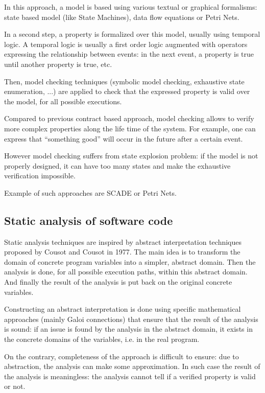 In this approach, a model is based using various textual or graphical
formalisms: state based model (like State Machines), data flow
equations or Petri Nets.

In a second step, a property is formalized over this model, usually
using temporal logic. A temporal logic is usually a first order logic
augmented with operators expressing the relationship between events:
in the next event, a property is true until another property is true,
etc.

Then, model checking techniques (symbolic model checking, exhaustive
state enumeration, ...) are applied to check that the expressed
property is valid over the model, for all possible executions.

Compared to previous contract based approach, model checking allows to
verify more complex properties along the life time of the system. For
example, one can express that ``something good'' will occur in the
future after a certain event.

However model checking suffers from state explosion problem: if the
model is not properly designed, it can have too many states and make
the exhaustive verification impossible.

Example of such approaches are SCADE or Petri Nets.

\subsection{Static analysis of software code}

Static analysis techniques are inspired by abstract interpretation
techniques proposed by Cousot and Cousot in 1977. The main idea is to
transform the domain of concrete program variables into a simpler,
abstract domain. Then the analysis is done, for all possible execution
paths, within this abstract domain. And finally the result of the
analysis is put back on the original concrete variables.

Constructing an abstract interpretation is done using specific
mathematical approaches (mainly Galoi connections) that ensure that
the result of the analysis is sound: if an issue is found by the
analysis in the abstract domain, it exists in the concrete domains of
the variables, i.e. in the real program.

On the contrary, completeness of the approach is difficult to ensure:
due to abstraction, the analysis can make some approximation. In such
case the result of the analysis is meaningless: the analysis cannot
tell if a verified property is valid or not.

